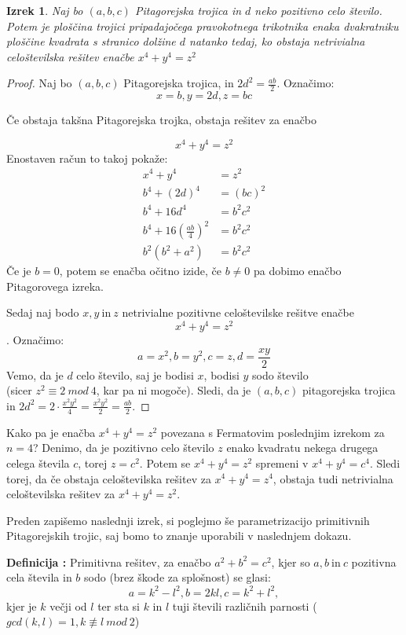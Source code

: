 \documentclass[a4paper, 10pt]{article}
\newtheorem{izr}{Izrek}
\newcounter{defcount}
\newenvironment{definicija}{\begin{flushleft}\stepcounter{defcount}\textbf{Definicija \arabic{defcount}:}}{\hfill\end{flushleft}}
\begin{document}
\begin{izr}
Naj bo $(a, b, c)$ Pitagorejska trojica in $d$ neko pozitivno celo število. Potem je ploščina trojici pripadajočega pravokotnega trikotnika enaka dvakratniku ploščine kvadrata s stranico dolžine $d$ natanko tedaj, ko obstaja netrivialna celoštevilska rešitev enačbe $x^4 + y^4 = z^2$
\end{izr}
\begin{proof}
Naj bo $(a, b, c)$ Pitagorejska trojica, in $2d^2 = \frac{ab}{2}$. Označimo:
\[
x = b, y = 2d, z = bc
\]

Če obstaja takšna Pitagorejska trojka, obstaja rešitev za enačbo 

\[
x^4 + y^4 = z^2
\]
Enostaven račun to takoj pokaže:
\begin{align*}
x^4 + y^4 &= z^2 \\
b^4 + (2d)^4 &= (bc)^2 \\
b^4 + 16d^4 &= b^2c^2 \\
b^4 + 16(\frac{ab}{4})^2 &= b^2c^2 \\
b^2(b^2 + a^2) &= b^2c^2 
\end{align*}
Če je $b=0$, potem se enačba očitno izide, če $b\neq 0$ pa dobimo enačbo Pitagorovega izreka.


Sedaj naj bodo $x, y~\text{in}~z$ netrivialne pozitivne celoštevilske rešitve enačbe \[x^4 + y^4 = z^2\].
Označimo:
\[
a = x^2, b = y^2, c = z, d =\frac{xy}{2}
\]
Vemo, da je $d$ celo število, saj je bodisi $x$, bodisi $y$ sodo število \\ (sicer $z^2 \equiv 2~mod~4$, kar pa ni mogoče).
Sledi, da je $(a, b, c)$ pitagorejska trojica in $2d^2 = 2 \cdot \frac{x^2y^2}{4} = \frac{x^2y^2}{2} = \frac{ab}{2}$.
\end{proof}

Kako pa je enačba $x^4 + y^4 = z^2$ povezana s Fermatovim poslednjim izrekom za $n=4$? Denimo, da je pozitivno celo število $z$ enako kvadratu nekega drugega celega števila $c$, torej $z=c^2$. Potem se $x^4 + y^4 = z^2$ spremeni v $x^4 + y^4 = c^4$. Sledi torej, da  če obstaja celoštevilska rešitev za $x^4 + y^4 = z^4$, obstaja tudi netrivialna celoštevilska rešitev za $x^4 + y^4 = z^2$.

Preden zapišemo naslednji izrek, si poglejmo še parametrizacijo primitivnih Pitagorejskih trojic, saj bomo to znanje uporabili v naslednjem dokazu.
\begin{definicija}
Primitivna rešitev, za enačbo $a^2 + b^2 = c^2$, kjer so $a, b~\text{in}~c$ pozitivna cela števila in $b$ sodo (brez škode za splošnost) se glasi:
\[
a = k^2 - l^2, b=2kl, c = k^2 + l^2,
\]
kjer je $k$ večji od $l$ ter sta si $k$ in $l$ tuji števili različnih parnosti ($gcd(k, l) = 1, k \not\equiv l~mod~2$)

\end{definicija}
\end{document}
